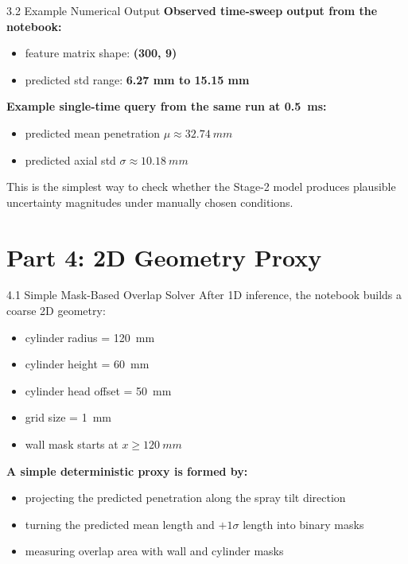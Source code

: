 \documentclass[UTF8,aspectratio=169]{ctexbeamer}
\begin{document}
\begin{frame}{3.2 Example Numerical Output}
\textbf{Observed time-sweep output from the notebook:}
\begin{itemize}
  \item feature matrix shape: \textbf{(300, 9)}
  \item predicted std range: \textbf{6.27 mm to 15.15 mm}
\end{itemize}

\vspace{0.3em}
\textbf{Example single-time query from the same run at \SI{0.5}{ms}:}
\begin{itemize}
  \item predicted mean penetration $\mu \approx \SI{32.74}{mm}$
  \item predicted axial std $\sigma \approx \SI{10.18}{mm}$
\end{itemize}

\vspace{0.3em}
This is the simplest way to check whether the Stage-2 model produces plausible uncertainty magnitudes under manually chosen conditions.
\end{frame}

\section{Part 4: 2D Geometry Proxy}

\begin{frame}{4.1 Simple Mask-Based Overlap Solver}
After 1D inference, the notebook builds a coarse 2D geometry:
\begin{itemize}
  \item cylinder radius = \SI{120}{mm}
  \item cylinder height = \SI{60}{mm}
  \item cylinder head offset = \SI{50}{mm}
  \item grid size = \SI{1}{mm}
  \item wall mask starts at $x \ge \SI{120}{mm}$
\end{itemize}

\vspace{0.3em}
\textbf{A simple deterministic proxy is formed by:}
\begin{itemize}
  \item projecting the predicted penetration along the spray tilt direction
  \item turning the predicted mean length and $+1\sigma$ length into binary masks
  \item measuring overlap area with wall and cylinder masks
\end{itemize}
\end{frame}
\end{document}
